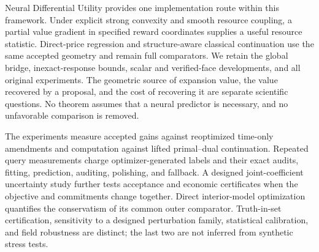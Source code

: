 Neural Differential Utility provides one implementation route within this
framework. Under explicit strong convexity and smooth resource coupling, a
partial value gradient in specified reward coordinates supplies a useful
resource statistic. Direct-price regression and structure-aware classical
continuation use the same accepted geometry and remain full comparators. We
retain the global bridge, inexact-response bounds, scalar and verified-face
developments, and all original experiments. The geometric source of expansion
value, the value recovered by a proposal, and the cost of recovering it are
separate scientific questions. No theorem assumes that a neural predictor is
necessary, and no unfavorable comparison is removed.

The experiments measure accepted gains against reoptimized time-only
amendments and computation against lifted primal--dual continuation. Repeated
query measurements charge optimizer-generated labels and their exact audits, fitting, prediction, auditing,
polishing, and fallback. A designed joint-coefficient uncertainty study further
tests acceptance and economic certificates when the objective and commitments
change together. Direct interior-model optimization quantifies the conservatism
of its common outer comparator. Truth-in-set certification, sensitivity to a
designed perturbation family, statistical calibration, and field robustness are
distinct; the last two are not inferred from synthetic stress tests.

